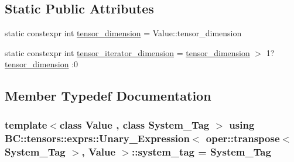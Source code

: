 \subsection*{Static Public Attributes}
\begin{DoxyCompactItemize}
\item 
static constexpr int \hyperlink{structBC_1_1tensors_1_1exprs_1_1Unary__Expression_3_01oper_1_1transpose_3_01System__Tag_01_4_00_01Value_01_4_acdfcb73f67e5e333b2a859827d16193c}{tensor\+\_\+dimension} = Value\+::tensor\+\_\+dimension
\item 
static constexpr int \hyperlink{structBC_1_1tensors_1_1exprs_1_1Unary__Expression_3_01oper_1_1transpose_3_01System__Tag_01_4_00_01Value_01_4_a1c87174aa66793563bd9b65a1865fcc7}{tensor\+\_\+iterator\+\_\+dimension} = \hyperlink{structBC_1_1tensors_1_1exprs_1_1Unary__Expression_3_01oper_1_1transpose_3_01System__Tag_01_4_00_01Value_01_4_acdfcb73f67e5e333b2a859827d16193c}{tensor\+\_\+dimension} $>$ 1? \hyperlink{structBC_1_1tensors_1_1exprs_1_1Unary__Expression_3_01oper_1_1transpose_3_01System__Tag_01_4_00_01Value_01_4_acdfcb73f67e5e333b2a859827d16193c}{tensor\+\_\+dimension} \+:0
\end{DoxyCompactItemize}


\subsection{Member Typedef Documentation}
\subsubsection[{\texorpdfstring{system\+\_\+tag}{system_tag}}]{\setlength{\rightskip}{0pt plus 5cm}template$<$class Value , class System\+\_\+\+Tag $>$ using {\bf B\+C\+::tensors\+::exprs\+::\+Unary\+\_\+\+Expression}$<$ {\bf oper\+::transpose}$<$ System\+\_\+\+Tag $>$, Value $>$\+::{\bf system\+\_\+tag} =  System\+\_\+\+Tag}\hypertarget{structBC_1_1tensors_1_1exprs_1_1Unary__Expression_3_01oper_1_1transpose_3_01System__Tag_01_4_00_01Value_01_4_abac4a581481062c8eaba8281e4d46d7a}{}\label{structBC_1_1tensors_1_1exprs_1_1Unary__Expression_3_01oper_1_1transpose_3_01System__Tag_01_4_00_01Value_01_4_abac4a581481062c8eaba8281e4d46d7a}
